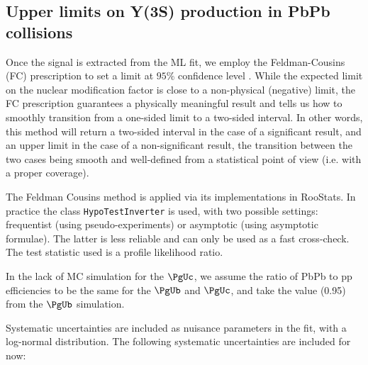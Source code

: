 \vfill\newpage
\subsection{Upper limits on Y(3S) production in PbPb collisions}
\label{sec:Y3S}

Once the signal is extracted from the ML fit,
we employ the Feldman-Cousins (FC) prescription to set a limit at $95\%$ confidence level%
.
While the expected limit on the nuclear modification factor is close to a
 non-physical (negative) limit, %
the FC prescription guarantees a physically meaningful result and tells us how to smoothly
transition from a one-sided limit to a two-sided interval. In other words, this method will return a two-sided interval
in the case of a significant result, and an upper limit in the case of a non-significant result, the transition
between the two cases being smooth and well-defined from a statistical point of view (i.e. with
a proper coverage).

The Feldman Cousins method is applied via its implementations in
RooStats. In practice the class \verb-HypoTestInverter- is used, with two possible settings: frequentist
(using pseudo-experiments) or asymptotic (using asymptotic formulae). The latter is less reliable and
can only be used as a fast cross-check. The test statistic used is a profile likelihood ratio.

In the lack of MC simulation for the $\PgUc$, we assume the ratio of PbPb to pp efficiencies to be the same for the $\PgUb$ and $\PgUc$, and
take the value (0.95) from the $\PgUb$ simulation.

Systematic uncertainties are included as nuisance parameters in the fit, with a log-normal distribution. The following systematic uncertainties are included for now:

